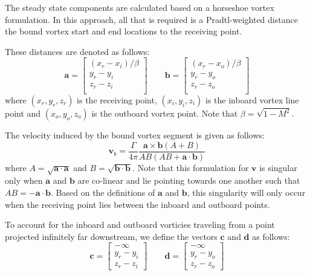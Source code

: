 \documentclass[12pt]{article}
\newcommand{\f}{\frac}
\newcommand{\mb}{\mathbf}
\begin{document}
The steady state components are calculated based on a horseshoe vortex
formulation. In this approach, all that is required is a
Pradtl-weighted distance the bound vortex start and end locations to
the receiving point. 

These distances are denoted as follows:
%
\begin{equation*}
  \mb{a} = \begin{bmatrix} 
    (x_{r} - x_{i})/\beta \\
    y_r - y_i \\
    z_r - z_i \\
  \end{bmatrix}
  \qquad
  \mb{b} = \begin{bmatrix} 
    (x_{r} - x_{o})/\beta \\
    y_r - y_o \\
    z_r - z_o \\
  \end{bmatrix}
\end{equation*}
%
where $(x_r, y_r, z_r)$ is the receiving point, $(x_{i}, y_{i},
z_{i})$ is the inboard vortex line point and $(x_{o}, y_{o}, z_{o})$
is the outboard vortex point. Note that $\beta = \sqrt{1 - M^2}$.

The velocity induced by the bound vortex segment is given as follows:
%
\begin{equation*}
  \mb{v}_{b} = \f{\Gamma}{4\pi} \f{\mb{a} \times \mb{b} (A + B)}{AB(AB + \mb{a}\cdot \mb{b})}
\end{equation*}
where $A = \sqrt{\mb{a}\cdot \mb{a}}$ and $B =
\sqrt{\mb{b}\cdot\mb{b}}$.  Note that this formulation for $\mb{v}$ is
singular only when $\mb{a}$ and $\mb{b}$ are co-linear and lie
pointing towards one another such that $AB = - \mb{a}\cdot \mb{b}$.
Based on the definitions of $\mb{a}$ and $\mb{b}$, this singularity
will only occur when the receiving point lies between the inboard and
outboard points.

To account for the inboard and outboard vorticies traveling from a
point projected infinitely far downstream, we define the vectors
$\mb{c}$ and $\mb{d}$ as follows:
%
\begin{equation*}
  \mb{c} = \begin{bmatrix}
    -\infty \\
    y_{r} - y_{i} \\ 
    z_{r} - z_{i}
  \end{bmatrix}
  \qquad
  \mb{d} = \begin{bmatrix}
    -\infty \\
    y_{r} - y_{o} \\ 
    z_{r} - z_{o}
  \end{bmatrix}
\end{equation*}
\end{document}
